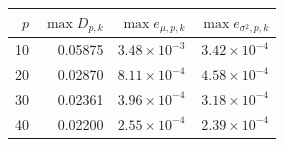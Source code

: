 \begin{tabular}{rrrr}
\hline
$p$ & $\max D_{p,k}$ & $\max e_{\mu,p,k}$ & $\max e_{\sigma^2,p,k}$ \\
\hline
10 & 0.05875 & $3.48\times10^{-3}$ & $3.42\times10^{-4}$ \\
20 & 0.02870 & $8.11\times10^{-4}$ & $4.58\times10^{-4}$ \\
30 & 0.02361 & $3.96\times10^{-4}$ & $3.18\times10^{-4}$ \\
40 & 0.02200 & $2.55\times10^{-4}$ & $2.39\times10^{-4}$ \\
\hline
\end{tabular}
